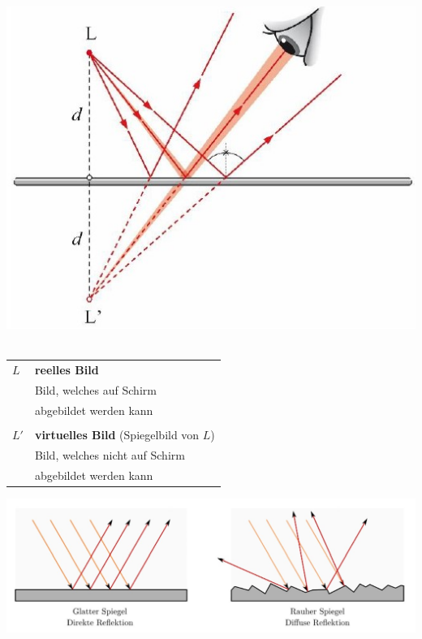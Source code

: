 \begin{minipage}{0.4\linewidth}
\includegraphics[width=\linewidth]{Bilder/Wellen-Optik/reflexion} \\
\\
\end{minipage}
\hfill
\begin{minipage}{0.58\linewidth}
	\begin{tabular}{ll}
		$L$ & \textbf{reelles Bild} \\
			& Bild, welches auf Schirm \\
			& abgebildet werden kann \\ 
			\\
		$L'$& \textbf{virtuelles Bild} \scriptsize(Spiegelbild von $L$)\normalsize\\
			& Bild, welches nicht auf Schirm \\
			& abgebildet werden kann \\
	\end{tabular}
\end{minipage}

\includegraphics[width=\linewidth]{Bilder/Wellen-Optik/rau-glatt.jpg}


